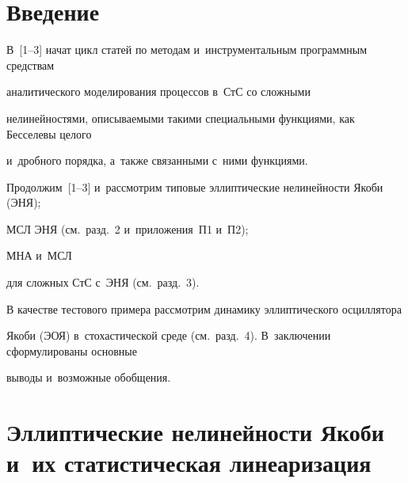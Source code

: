 












      \thispagestyle{headings}

      






\section{Введение}



В~[1--3] начат цикл статей по методам и~инструментальным программным средствам 

аналитического моделирования процессов в~СтС со сложными 

нелинейностями, описываемыми такими специальными функциями, как Бесселевы целого 

и~дробного порядка, а~также связанными с~ними функциями.



Продолжим~[1--3] и~рассмотрим типовые эллиптические нелинейности Якоби (ЭНЯ); 

МСЛ ЭНЯ (см.\ разд.~2 и~приложения~П1 и~П2); 

МНА и~МСЛ 

для сложных СтС с~ЭНЯ (см.\ разд.~3).

В качестве тестового примера рассмотрим динамику эллиптического осциллятора 

Якоби (ЭОЯ) в~стохастической среде (см.\  разд.~4). В~заключении сформулированы основные 

выводы и~возможные обобщения.



\section{Эллиптические нелинейности Якоби и~их статистическая линеаризация}




